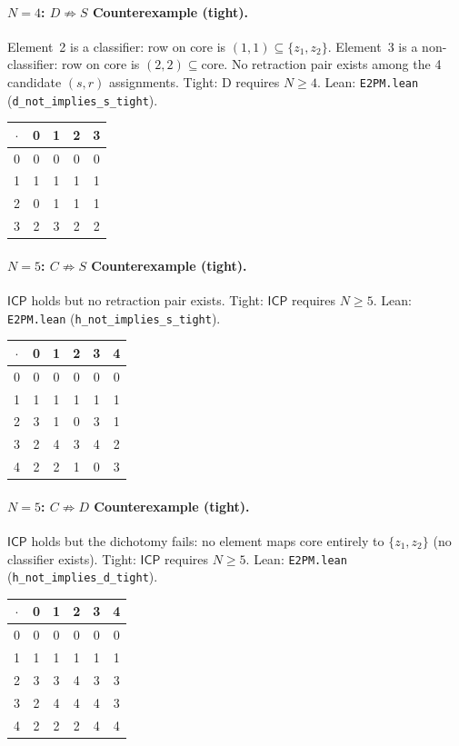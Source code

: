 \documentclass[sigconf,screen]{acmart}
\newcommand{\dotop}{\cdot}
\newcommand{\ICP}{\textsf{ICP}}
\newcommand{\core}{\mathrm{core}}
\theoremstyle{remark}
\begin{document}
\paragraph{$N\!=\!4$: $D \not\Rightarrow S$ Counterexample (tight).}
Element~2 is a classifier: row on core is $(1,1) \subseteq \{z_1, z_2\}$. Element~3 is a non-classifier: row on core is $(2,2) \subseteq \core$. No retraction pair exists among the 4 candidate $(s,r)$ assignments. Tight: D requires $N \geq 4$. \quad Lean: \texttt{E2PM.lean} (\texttt{d\_not\_implies\_s\_tight}).

\medskip
{\small
\begin{tabular}{c|cccc}
$\dotop$ & 0 & 1 & 2 & 3 \\\hline
0 & 0 & 0 & 0 & 0 \\
1 & 1 & 1 & 1 & 1 \\
2 & 0 & 1 & 1 & 1 \\
3 & 2 & 3 & 2 & 2 \\
\end{tabular}}

\paragraph{$N\!=\!5$: $C \not\Rightarrow S$ Counterexample (tight).}
$\ICP$ holds but no retraction pair exists. Tight: $\ICP$ requires $N \geq 5$. \quad Lean: \texttt{E2PM.lean} (\texttt{h\_not\_implies\_s\_tight}).

\medskip
{\small
\begin{tabular}{c|ccccc}
$\dotop$ & 0 & 1 & 2 & 3 & 4 \\\hline
0 & 0 & 0 & 0 & 0 & 0 \\
1 & 1 & 1 & 1 & 1 & 1 \\
2 & 3 & 1 & 0 & 3 & 1 \\
3 & 2 & 4 & 3 & 4 & 2 \\
4 & 2 & 2 & 1 & 0 & 3 \\
\end{tabular}}

\paragraph{$N\!=\!5$: $C \not\Rightarrow D$ Counterexample (tight).}
$\ICP$ holds but the dichotomy fails: no element maps core entirely to $\{z_1, z_2\}$ (no classifier exists). Tight: $\ICP$ requires $N \geq 5$. \quad Lean: \texttt{E2PM.lean} (\texttt{h\_not\_implies\_d\_tight}).

\medskip
{\small
\begin{tabular}{c|ccccc}
$\dotop$ & 0 & 1 & 2 & 3 & 4 \\\hline
0 & 0 & 0 & 0 & 0 & 0 \\
1 & 1 & 1 & 1 & 1 & 1 \\
2 & 3 & 3 & 4 & 3 & 3 \\
3 & 2 & 4 & 4 & 4 & 3 \\
4 & 2 & 2 & 2 & 4 & 4 \\
\end{tabular}}
\end{document}
